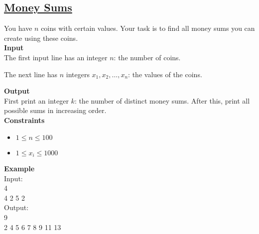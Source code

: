 \subsection{\href{https://cses.fi/problemset/task/1745}{Money Sums}}

You have $n$ coins with certain values. Your task is to find all money sums you can create using these coins.\\

\hfill \break
\textbf{Input}\\
The first input line has an integer $n$: the number of coins.

The next line has $n$ integers $x_1,x_2,…,x_n$: the values of the coins.

\hfill \break
\textbf{Output}\\
First print an integer $k$: the number of distinct money sums. After this, print all possible sums in increasing order.\\
\hfill \break
\textbf{Constraints}\\
\begin{itemize}[noitemsep]
    \item $1 \leq n \leq 100 $
    \item $1 \leq x_i \leq 1000 $
\end{itemize}
\textbf{Example}\\
Input:\\
4\\
4 2 5 2\\
\hfill \break
Output:\\
9\\
2 4 5 6 7 8 9 11 13